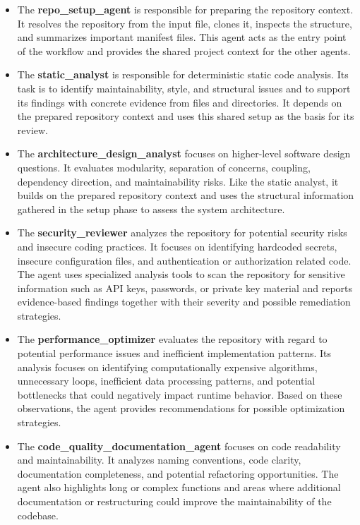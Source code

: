 \documentclass[conference]{IEEEtran}
\begin{document}
\begin{itemize}
	\item The \textbf{repo\_setup\_agent} is responsible for preparing the repository context. It resolves the repository from the input file, clones it, inspects the structure, and summarizes important manifest files. This agent acts as the entry point of the workflow and provides the shared project context for the other agents.
	
	
	\item The \textbf{static\_analyst} is responsible for deterministic static code analysis. Its task is to identify maintainability, style, and structural issues and to support its findings with concrete evidence from files and directories. It depends on the prepared repository context and uses this shared setup as the basis for its review.
	
	
	\item The \textbf{architecture\_design\_analyst} focuses on higher-level software design questions. It evaluates modularity, separation of concerns, coupling, dependency direction, and maintainability risks. Like the static analyst, it builds on the prepared repository context and uses the structural information gathered in the setup phase to assess the system architecture.
	
	
	\item The \textbf{security\_reviewer} analyzes the repository for potential security risks and insecure coding practices. It focuses on identifying hardcoded secrets, insecure configuration files, and authentication or authorization related code. The agent uses specialized analysis tools to scan the repository for sensitive information such as API keys, passwords, or private key material and reports evidence-based findings together with their severity and possible remediation strategies.
	
	\item The \textbf{performance\_optimizer} evaluates the repository with regard to potential performance issues and inefficient implementation patterns. Its analysis focuses on identifying computationally expensive algorithms, unnecessary loops, inefficient data processing patterns, and potential bottlenecks that could negatively impact runtime behavior. Based on these observations, the agent provides recommendations for possible optimization strategies.
	
	\item The \textbf{code\_quality\_documentation\_agent} focuses on code readability and maintainability. It analyzes naming conventions, code clarity, documentation completeness, and potential refactoring opportunities. The agent also highlights long or complex functions and areas where additional documentation or restructuring could improve the maintainability of the codebase.
	

\end{itemize}
\end{document}
